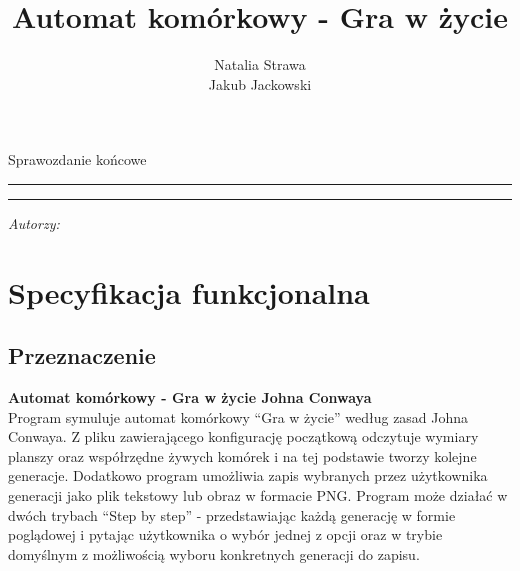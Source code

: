 \documentclass[12pt,a4paper,notitlepage]{report}
\author{Natalia Strawa\\
	Jakub Jackowski}
\title{Automat komórkowy - Gra w życie}
\makeatletter
\newcommand{\linia}{\rule{\linewidth}{0.4mm}}
\renewcommand{\maketitle}{\begin{titlepage}
\thispagestyle{fancy}
		
		
		\vspace*{1cm}
		
		\begin{center}
			
			\Large
			
			Sprawozdanie końcowe
			
		\end{center}
		
		\vspace{3cm}
		
		\noindent\linia
		
		\begin{center}
			
			\LARGE \textsc{\@title}
			
		\end{center}
		
		\noindent\linia
		
		\vspace{0.5cm}
		
		\begin{flushright}
			
			\begin{minipage}{5cm}
				
				\textit{\small Autorzy:}\\
				
				\normalsize \textsc{\@author} \par
				
			\end{minipage}
			
			
		\end{flushright}
		
		\vspace*{\stretch{6}}
		
		
	\end{titlepage}%
	
}
\makeatother
\begin{document}
\maketitle
\newpage
\tableofcontents
\setcounter{page}{2}
\thispagestyle{fancy}
\newpage
\section{Specyfikacja funkcjonalna}

\subsection{Przeznaczenie}
\large\textbf{ Automat komórkowy - Gra w życie Johna Conwaya}\\
Program symuluje automat komórkowy “Gra w życie” według zasad Johna Conwaya. Z pliku zawierającego konfigurację początkową odczytuje wymiary planszy oraz współrzędne żywych komórek i na tej podstawie tworzy kolejne generacje. Dodatkowo program umożliwia zapis wybranych przez użytkownika generacji jako plik tekstowy lub obraz w formacie PNG. Program może działać w dwóch trybach “Step by step” - przedstawiając każdą generację w formie poglądowej i pytając użytkownika o wybór jednej z opcji oraz w trybie domyślnym z możliwością wyboru konkretnych generacji do zapisu.
\end{document}

